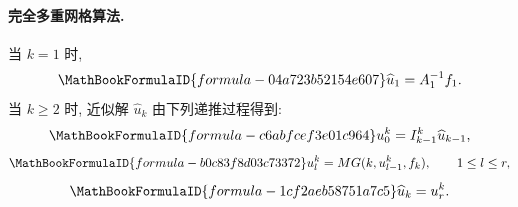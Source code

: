 \paragraph*{完全多重网格算法.}
当 $k=1$ 时,
\[
\MathBookFormulaID{formula-04a723b52154e607}
\widehat u_1=A_1^{-1}f_1.
\]
当 $k\geq 2$ 时, 近似解 $\widehat u_k$ 由下列递推过程得到:
\[
\MathBookFormulaID{formula-c6abfcef3e01c964}
u_0^k=I_{k-1}^{k}\widehat u_{k-1},
\]
\[
\MathBookFormulaID{formula-b0c83f8d03c73372}
u_l^k=MG(k,u_{l-1}^k,f_k),
\qquad 1\leq l\leq r,
\]
\[
\MathBookFormulaID{formula-1cf2aeb58751a7c5}
\widehat u_k=u_r^k.
\]

